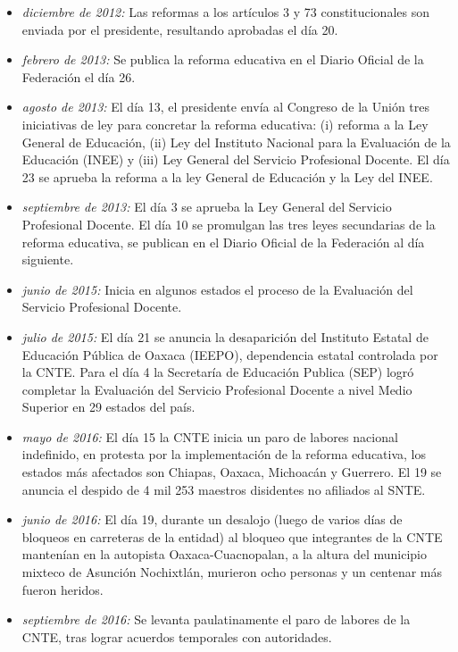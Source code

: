 \documentclass[letterpaper, 11pt]{book}
\theoremstyle{definition}
\theoremstyle{remark}
\begin{document}
\begin{itemize}
    \setlength\itemsep{0em}
    \item \emph{diciembre de 2012:} Las reformas a los artículos 3 y 73 constitucionales son enviada por el presidente, resultando aprobadas el día 20.
    \item \emph{febrero de 2013:} Se publica la reforma educativa en el Diario Oficial de la Federación el día 26.
    \item \emph{agosto de 2013:} El día 13, el presidente envía al Congreso de la Unión tres iniciativas de ley para concretar la reforma educativa: (i) reforma a la Ley General de Educación, (ii) Ley del Instituto Nacional para la Evaluación de la Educación (INEE) y (iii) Ley General del Servicio Profesional Docente. 
    El día 23 se aprueba la reforma a la ley General de  Educación y la Ley del INEE.
    \item \emph{septiembre de 2013:} El día 3 se aprueba la Ley General del Servicio  Profesional Docente. 
    El día 10 se promulgan las tres leyes secundarias de la  reforma educativa, se publican en el Diario Oficial de la Federación al día siguiente. 
    \item \emph{junio de 2015:} Inicia en algunos estados el proceso de la Evaluación del Servicio Profesional Docente. 
    \item \emph{julio de 2015:} El día 21 se anuncia la desaparición del Instituto Estatal de Educación Pública de Oaxaca (IEEPO), dependencia estatal controlada por la CNTE. Para el día 4 la Secretaría de Educación Publica (SEP) logró completar la Evaluación del Servicio Profesional Docente a nivel Medio Superior en 29 estados del país.
    \item \emph{mayo de 2016:} El día 15 la CNTE inicia un paro de labores nacional indefinido, en protesta por la implementación de la reforma educativa, los estados más afectados son Chiapas, Oaxaca, Michoacán y Guerrero. El 19 se anuncia el despido de 4 mil 253 maestros disidentes no afiliados al SNTE.
    \item \emph{junio de 2016:} El día 19, durante un desalojo (luego de varios días de bloqueos en carreteras de la entidad) al bloqueo que integrantes de la CNTE mantenían en la autopista Oaxaca-Cuacnopalan, a la altura del municipio mixteco de Asunción Nochixtlán, murieron ocho personas y un centenar más fueron heridos.
    \item \emph{septiembre de 2016:} Se levanta paulatinamente el paro de labores de la CNTE, tras lograr acuerdos temporales con autoridades.
\end{itemize}
\end{document}
